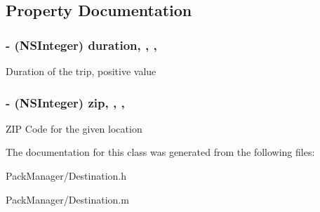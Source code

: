 \subsection{Property Documentation}
\hypertarget{interface_destination_a83a4c63fc216c137f29aadaa4be1fda2}{
\subsubsection[{duration}]{\setlength{\rightskip}{0pt plus 5cm}-\/ (N\-S\-Integer) duration\hspace{0.3cm}{\ttfamily [read]}, {\ttfamily [write]}, {\ttfamily [nonatomic]}, {\ttfamily [assign]}}}\label{interface_destination_a83a4c63fc216c137f29aadaa4be1fda2}
Duration of the trip, positive value \hypertarget{interface_destination_ac3fa98f68bc95bf00852743e1b3d3f9a}{
\subsubsection[{zip}]{\setlength{\rightskip}{0pt plus 5cm}-\/ (N\-S\-Integer) zip\hspace{0.3cm}{\ttfamily [read]}, {\ttfamily [write]}, {\ttfamily [nonatomic]}, {\ttfamily [assign]}}}\label{interface_destination_ac3fa98f68bc95bf00852743e1b3d3f9a}
Z\-I\-P Code for the given location 

The documentation for this class was generated from the following files\-:\begin{DoxyCompactItemize}
\item 
Pack\-Manager/Destination.\-h\item 
Pack\-Manager/Destination.\-m\end{DoxyCompactItemize}
